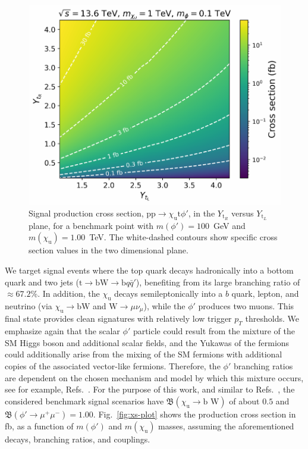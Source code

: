 \begin{figure}
    \centering
    \includegraphics[width=0.85\linewidth]{Images/cross_section_by_lambdas.pdf}
    \caption{Signal production cross section, $ \mathrm{pp}\to \chi_\mathrm{u} \mathrm{t} \phi'$,  in the $Y_{\mathrm{t}_R}$ versus $Y_{\mathrm{t}_L}$ plane, for a benchmark point with $m(\phi')=100$~\textrm{GeV} and $m(\chi_\mathrm{u})=1.00$~\textrm{TeV}. The white-dashed contours show specific cross section values in the two dimensional plane.}
    \label{fig:cross_section_by_lambdas}
\end{figure}

We target signal events where the top quark decays hadronically into a bottom quark and two jets ($\mathrm{t} \to \mathrm{bW} \to \mathrm{b} q \bar{q}'$), benefiting from its large branching ratio of $\approx 67.2$\%. In addition, the $\chi_\mathrm{u}$ decays semileptonically into a $b$ quark, lepton, and neutrino (via $\chi_\mathrm{u} \to \mathrm{bW}$ and $\mathrm{W}\to\mu\nu_{\mu}$), while the $\phi'$ produces two muons. This final state provides clean signatures with relatively low trigger $p_T$ thresholds. We emphasize again that the scalar $\phi'$ particle could result from the mixture of the SM Higgs boson and additional scalar fields, and the Yukawas of the fermions could additionally arise from the mixing of the SM fermions with additional copies of the associated vector-like fermions. Therefore, the $\phi'$ branching ratios are dependent on the chosen mechanism and model by which this mixture occurs, see for example, Refs.~\parencite{Cacciapaglia_2023,Blankenburg:2012nx,Jones-Perez:2013oia,Calibbi:2009pv}. For the purpose of this work, and 
similar to Refs.~\parencite{Dutta2020,Dutta2023}, the considered benchmark signal scenarios have $\mathfrak{B}(\chi_\mathrm{u} \rightarrow \textrm{b W})$ of about $0.5$ and $\mathfrak{B}(\phi' \rightarrow \mu^+\mu^-)=1.00$. Fig.~\ref{fig:xs-plot} shows the production cross section in \textrm{fb}, as a function of $m(\phi')$ and $m(\chi_\mathrm{u})$ masses, assuming the aforementioned decays, branching ratios, and couplings.

